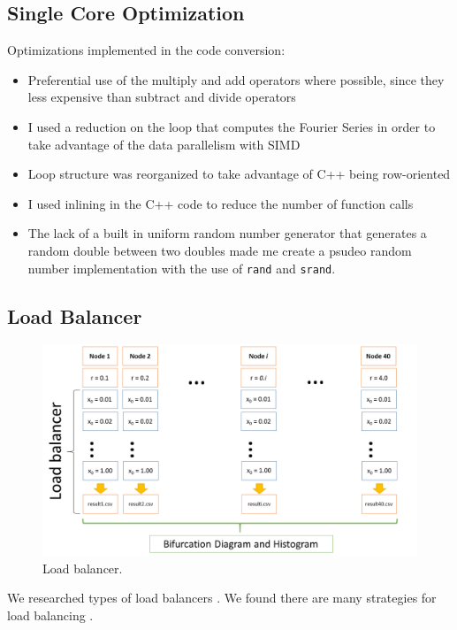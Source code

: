 \documentclass[12pt]{article}
\newcommand{\bi}{\begin{itemize}}
\newcommand{\ei}{\end{itemize}}
\begin{document}
\subsection{Single Core Optimization}
Optimizations implemented in the code conversion:
\bi
\item Preferential use of the  multiply and add operators where possible, since
they less expensive than subtract and divide operators
\item I used a reduction on the loop that computes the Fourier Series
  in order to take advantage of the data parallelism with SIMD
\item Loop structure was reorganized to take advantage of C++ being row-oriented
\item I used inlining in the C++ code to reduce the number of function calls
\item The lack of a built in uniform random number generator that generates a random
double between two doubles made me create a psudeo random number
implementation with the use of \texttt{rand} and \texttt{srand}.

\ei
\subsection{Load Balancer}
\begin{figure}[H]
	\begin{center}
		\includegraphics[scale=0.4]{load_balancer}
\caption{Load balancer.}
	\end{center}
\end{figure}
We researched types of load balancers \cite{olivier}. We found there
are many strategies for load balancing \cite{dlb}.
\end{document}
